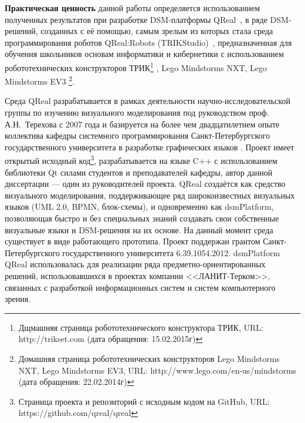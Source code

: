 \textbf{Практическая ценность} данной работы определяется использованием полученных 
результатов при разработке \ac{DSM}-платформы QReal~\cite{terekhov2009architecture, kuzenkova2011qreal}, 
в ряде \ac{DSM}-решений, созданных с её помощью, самым зрелым из которых стала среда программирования 
роботов QReal:Robots (TRIKStudio)~\cite{bryksin2011robots}, предназначенная для обучения 
школьников основам информатики и кибернетики с использованием робототехнических 
конструкторов ТРИК\footnote{Дщмашняя страница робототехнического конструктора ТРИК, URL: http://trikset.com (дата обращения: 15.02.2015г)}%
, Lego Mindstorms NXT, Lego Mindstorms EV3%
\footnote{Домашняя страница робототехнических конструкторов Lego Mindstorms NXT, Lego Mindstorms EV3,
URL: http://www.lego.com/en-us/mindstorms (дата обращения: 22.02.2014г)}.

Среда QReal разрабатывается в рамках деятельности научно-исследовательской 
группы по изучению визуального моделирования под руководством проф. 
А.Н.~Терехова с 2007 года и базируется на более чем двадцатилетнем опыте 
коллектива кафедры системного программирования Санкт-Петербургского 
государственного университета в разработке графических языков 
\cite{ivanov2005realit, parfenov1997rtst, terekhov1998rtst, ivanov1998object, ivanov1998behavioral}. 
Проект имеет открытый исходный 
код\footnote{Страница проекта и репозиторий с исходным кодом на GitHub, URL: https://github.com/qreal/qreal}, 
разрабатывается на языке C++ с использованием библиотеки Qt силами студентов и преподавателей кафедры, автор 
данной диссертации --- один из руководителей проекта. QReal создаётся как 
средство визуального моделирования, поддерживающее ряд широкоизвестных 
визуальных языков (\ac{UML} 2.0, \ac{BPMN}, блок-схемы), и одновременно как \ac{dsmPlatform}, 
позволяющая быстро и без специальных знаний создавать свои собственные 
визуальные языки и \ac{DSM}-решения на их основе. На данный момент среда существует 
в виде работающего прототипа. Проект поддержан грантом Санкт-Петербургского 
государственного университета 6.39.1054.2012. \ac{dsmPlatform} QReal использовалась
 для реализации ряда предметно-ориентированных решений, использовавшихся в 
проектах компании <<ЛАНИТ-Терком>>, связанных с разработкой информационных систем 
и систем компьютерного зрения.

